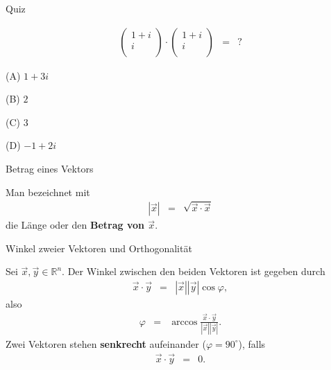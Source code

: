 \documentclass[german]{beamer}
\newcommand{\bq}{\begin{eqnarray*}}
\newcommand{\eq}{\end{eqnarray*}}
\begin{document}
\begin{frame}{Quiz}

\bq
 \left( \begin{array}{c} 1+i \\ i \\ \end{array} \right)
 \cdot
 \left( \begin{array}{c} 1+i  \\ i \\ \end{array} \right)
 & = & ?
\eq
\begin{description}
\item{(A)} $1+3i$
\item{(B)} $2$
\item{(C)} $3$
\item{(D)} $-1+2i$
\end{description}

\end{frame}

\begin{frame}{Betrag eines Vektors}

\begin{definition}
Man bezeichnet mit
\bq
 \left| \vec{x} \right|
 & = & \sqrt{ \vec{x} \cdot \vec{x}}
\eq
die L\"ange oder den {\bf Betrag von $\vec{x}$}.
\end{definition}


\end{frame}

\begin{frame}{Winkel zweier Vektoren und Orthogonalit\"at}

Sei \alert{$\vec{x}, \vec{y} \in {\mathbb R}^n$}. Der Winkel zwischen den beiden Vektoren
ist gegeben durch
\bq
 \vec{x} \cdot \vec{y} & = & \left| \vec{x} \right| \left| \vec{y} \right| \cos \varphi,
\eq
also
\bq 
\varphi & = & \arccos \frac{\vec{x} \cdot \vec{y}}{\left| \vec{x} \right| \left| \vec{y} \right|}.
\eq
Zwei Vektoren stehen {\bf senkrecht} aufeinander ($\varphi=90^\circ$), falls
\bq
 \vec{x} \cdot \vec{y} & = & 0.
\eq

\end{frame}

\end{document}
